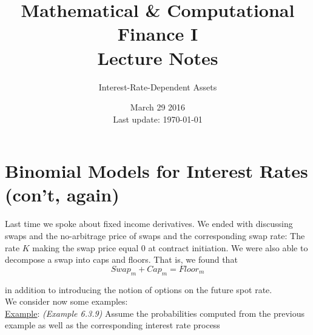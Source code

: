 \documentclass[12pt]{article}
\begin{document}
 
 
\title{Mathematical \& Computational Finance I\\Lecture Notes}
\author{Interest-Rate-Dependent Assets}
\date{March 29 2016 \\ Last update: \today{}}
\maketitle

\section{Binomial Models for Interest Rates (con't, again)}

Last time we spoke about fixed income derivatives. We ended with discussing swaps and the no-arbitrage price of swaps and the corresponding swap rate: The rate $K$ making the swap price equal 0 at contract initiation. We were also able to decompose a swap into caps and floors. That is, we found that
\begin{equation*}
	Swap_m + Cap_m = Floor_m
\end{equation*}

in addition to introducing the notion of options on the future spot rate. \\

We consider now some examples: \\

\underline{Example}: {\em (Example 6.3.9)} Assume the probabilities computed from the previous example as well as the corresponding interest rate process
\end{document}
